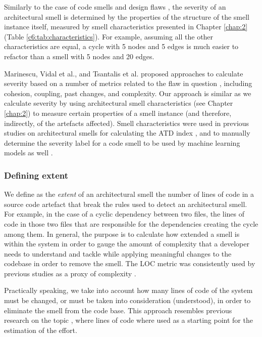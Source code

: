 Similarly to the case of code smells \cite{Arcelli2017b, Arcelli2015b} and design flaws \cite{Marinescu2012}, the severity of an architectural smell is determined by the properties of the structure of the smell instance itself, measured by smell characteristics presented in Chapter \ref{chap:2} (Table \ref*{c6:tab:characteristics}).
For example, assuming all the other characteristics are equal, a cycle with 5 nodes and 5 edges is much easier to refactor than a smell with 5 nodes and 20 edges.

Marinescu, Vidal et al., and Tsantalis et al. proposed approaches to calculate severity based on a number of metrics related to the flaw in question \cite{Marinescu2012, Vidal2016,Tsantalis2011}, including cohesion, coupling, past changes, and complexity.
Our approach is similar as we calculate severity by using architectural smell characteristics (see Chapter \ref{chap:2}) to measure certain properties of a smell instance (and therefore, indirectly, of the artefacts affected).
Smell characteristics were used in previous studies on architectural smells for calculating the ATD index  \cite{Roveda2018}, and to manually determine the severity label for a code smell to be used by machine learning models as well \cite{Arcelli2017b}.

\subsubsection{Defining extent}\label{c6:sec:approach-extent}
We define as the \emph{extent} of an architectural smell the number of lines of code in a source code artefact that break the rules used to detect an architectural smell.
For example, in the case of a cyclic dependency between two files, the lines of code in those two files that are responsible for the dependencies creating the cycle among them.
In general, the purpose is to calculate how extended a smell is within the system in order to gauge the amount of complexity that a developer needs to understand and tackle while applying meaningful changes to the codebase in order to remove the smell.
The LOC metric was consistently used by previous studies as a proxy of complexity \cite{Morasca2001, Kitchenham2004, Morozoff2010}.%

Practically speaking, we take into account how many lines of code of the system must be changed, or must be taken into consideration (understood), in order to eliminate the smell from the code base.
This approach resembles previous research on the topic \cite{Nugroho2011}, where lines of code where used as a starting point for the estimation of the effort.


